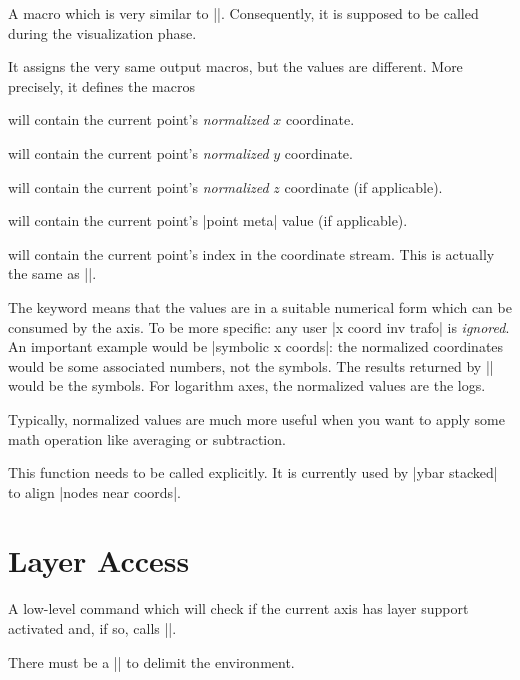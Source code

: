 \begin{command}{\pgfplotspointgetnormalizedcoordinates}
    A macro which is very similar to |\pgfplotspointgetcoordinates|.
    Consequently, it is supposed to be called during the visualization phase.

    It assigns the very same output macros, but the values are different. More
    precisely, it defines the macros

     will contain the current point's
    \emph{normalized} $x$ coordinate.

     will contain the current point's
    \emph{normalized} $y$ coordinate.

     will contain the current point's
    \emph{normalized} $z$ coordinate (if applicable).

     will contain the current point's
    |point meta| value (if applicable).

     will contain the current point's index in
    the coordinate stream. This is actually the same as |\coordindex|.

    The keyword  means that the values are in a
    suitable numerical form which can be consumed by the axis. To be more
    specific: any user |x coord inv trafo| is \emph{ignored}. An important
    example would be |symbolic x coords|: the normalized coordinates would be
    some associated numbers, not the symbols. The results returned by
    |\pgfplotspointgetcoordinates| would be the symbols. For logarithm axes,
    the normalized values are the logs.

    Typically, normalized values are much more useful when you want to apply
    some math operation like averaging or subtraction.

    This function needs to be called explicitly. It is currently used by
    |ybar stacked| to align |nodes near coords|.
\end{command}


\section{Layer Access}

\begin{command}{\pgfplotsonlayer{}}
    A low-level command which will check if the current axis has layer support
    activated and, if so, calls |\pgfonlayer|.

    There must be a |\endpgfplotsonlayer| to delimit the environment.
\end{command}

